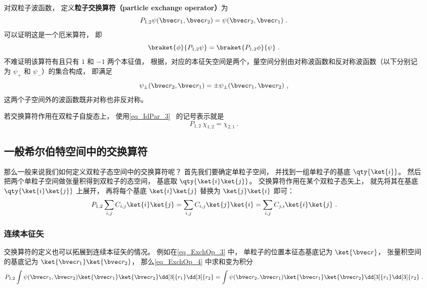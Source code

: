 
\begin{issues}
\end{issues}


对双粒子波函数， 定义\textbf{粒子交换算符（particle exchange operator）}为
\begin{equation}\label{eq_ExchOp_3}
P_{1,2}\psi(\bvec r_1, \bvec r_2) = \psi(\bvec r_2, \bvec r_1)~.
\end{equation}
可以证明这是一个厄米算符， 即
\begin{equation}
\braket{\phi}{P_{1,2}\psi} = \braket{P_{1,2}\phi}{\psi}~.
\end{equation}
不难证明该算符有且只有 $1$ 和 $-1$ 两个本征值， 根据，对应的本征矢空间是两个，量空间分别由对称波函数和反对称波函数（以下分别记为 $\psi_+$ 和 $\psi_-$）的集合构成， 即满足
\begin{equation}
\psi_\pm(\bvec r_2, \bvec r_1) = \pm\psi_\pm(\bvec r_1, \bvec r_2)~,
\end{equation}
这两个子空间外的波函数既非对称也非反对称。

若交换算符作用在双粒子自旋态上， 使用\autoref{eq_IdPar_3}~ 的记号表示就是
\begin{equation}\label{eq_ExchOp_6}
P_{1,2}\ \chi_{1,2} = \chi_{2,1}~.
\end{equation}

\subsection{一般希尔伯特空间中的交换算符}
那么一般来说我们如何定义双粒子态空间中的交换算符呢？ 首先我们要确定单粒子空间， 并找到一组单粒子的基底 $\qty{\ket{i}}$。 然后把两个单粒子空间做张量积得到双粒子的态空间， 基底取 $\qty{\ket{i}\ket{j}}$。 交换算符作用在某个双粒子态矢上， 就先将其在基底 $\qty{\ket{i}\ket{j}}$ 上展开， 再将每个基底 $\ket{i}\ket{j}$ 替换为 $\ket{j}\ket{i}$ 即可：
\begin{equation}\label{eq_ExchOp_4}
P_{1,2} \sum_{i,j} C_{i,j} \ket{i}\ket{j} = \sum_{i,j} C_{i,j} \ket{j}\ket{i} = \sum_{i,j} C_{j,i} \ket{i}\ket{j}~.
\end{equation}

\subsubsection{连续本征矢}
交换算符的定义也可以拓展到连续本征矢的情况。 例如在\autoref{eq_ExchOp_3} 中， 单粒子的位置本征态基底记为 $\ket{\bvec r}$， 张量积空间的基底记为 $\ket{\bvec r_1}\ket{\bvec r_2}$， 那么\autoref{eq_ExchOp_4} 中求和变为积分
\begin{equation}
P_{1,2} \int \psi(\bvec r_1, \bvec r_2) \ket{\bvec r_1}\ket{\bvec r_2} \dd[3]{r_1} \dd[3]{r_2} = \int \psi(\bvec r_2, \bvec r_1) \ket{\bvec r_1}\ket{\bvec r_2} \dd[3]{r_1} \dd[3]{r_2}~.
\end{equation}

